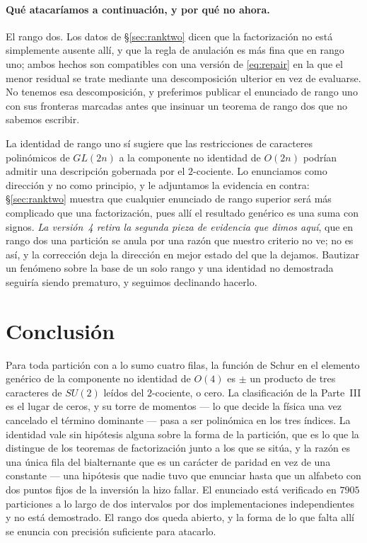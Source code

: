 \documentclass[11pt,a4paper]{article}
\begin{document}
\paragraph{Qu\'e atacar\'iamos a continuaci\'on, y por qu\'e no ahora.} El rango dos. Los datos
de \S\ref{sec:ranktwo} dicen que la factorizaci\'on no est\'a simplemente ausente all\'i, y que
la regla de anulaci\'on es m\'as fina que en rango uno; ambos hechos son compatibles con una
versi\'on de \eqref{eq:repair} en la que el menor residual se trate mediante una descomposici\'on
ulterior en vez de evaluarse. No tenemos esa descomposici\'on, y preferimos publicar el
enunciado de rango uno con sus fronteras marcadas antes que insinuar un teorema de rango dos
que no sabemos escribir.

La identidad de rango uno s\'i sugiere que las restricciones de caracteres polin\'omicos de
$GL(2n)$ a la componente no identidad de $O(2n)$ podr\'ian admitir una descripci\'on gobernada
por el $2$-cociente. Lo enunciamos como direcci\'on y no como principio, y le adjuntamos la
evidencia en contra: \S\ref{sec:ranktwo} muestra que cualquier enunciado de rango superior
ser\'a m\'as complicado que una factorizaci\'on, pues all\'i el resultado gen\'erico es una suma
con signos. \emph{La versi\'on~4 retira la segunda pieza de evidencia que dimos aqu\'i}, que en
rango dos una partici\'on se anula por una raz\'on que nuestro criterio no ve; no es as\'i, y la
correcci\'on deja la direcci\'on en mejor estado del que la dejamos. Bautizar un fen\'omeno sobre
la base de un solo rango y una identidad no demostrada seguir\'ia siendo prematuro, y seguimos
declinando hacerlo.

\section{Conclusi\'on}\label{sec:conclusion}

Para toda partici\'on con a lo sumo cuatro filas, la funci\'on de Schur en el elemento
gen\'erico de la componente no identidad de $O(4)$ es $\pm$ un producto de tres caracteres de
$SU(2)$ le\'idos del $2$-cociente, o cero. La clasificaci\'on de la Parte~III es el lugar de
ceros, y su torre de momentos --- lo que decide la f\'isica una vez cancelado el t\'ermino
dominante --- pasa a ser polin\'omica en los tres \'indices. La identidad vale sin hip\'otesis
alguna sobre la forma de la partici\'on, que es lo que la distingue de los teoremas de
factorizaci\'on junto a los que se sit\'ua, y la raz\'on es una \'unica fila del bialternante
que es un car\'acter de paridad en vez de una constante --- una hip\'otesis que nadie tuvo que
enunciar hasta que un alfabeto con dos puntos fijos de la inversi\'on la hizo fallar. El
enunciado est\'a verificado en $7905$ particiones a lo largo de dos intervalos por dos
implementaciones independientes y no est\'a demostrado. El rango dos queda abierto, y la forma
de lo que falta all\'i se enuncia con precisi\'on suficiente para atacarlo.
\end{document}
